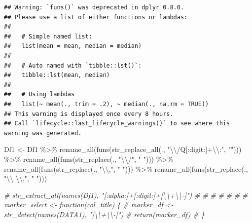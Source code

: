 \documentclass[
]{book}
\newenvironment{Shaded}{\begin{snugshade}}{\end{snugshade}}
\newcommand{\CommentTok}[1]{\textcolor[rgb]{0.56,0.35,0.01}{\textit{#1}}}
\newcommand{\FunctionTok}[1]{\textcolor[rgb]{0.00,0.00,0.00}{#1}}
\newcommand{\NormalTok}[1]{#1}
\newcommand{\OtherTok}[1]{\textcolor[rgb]{0.56,0.35,0.01}{#1}}
\newcommand{\SpecialCharTok}[1]{\textcolor[rgb]{0.00,0.00,0.00}{#1}}
\newcommand{\StringTok}[1]{\textcolor[rgb]{0.31,0.60,0.02}{#1}}
\begin{document}
\begin{verbatim}
## Warning: `funs()` was deprecated in dplyr 0.8.0.
## Please use a list of either functions or lambdas: 
## 
##   # Simple named list: 
##   list(mean = mean, median = median)
## 
##   # Auto named with `tibble::lst()`: 
##   tibble::lst(mean, median)
## 
##   # Using lambdas
##   list(~ mean(., trim = .2), ~ median(., na.rm = TRUE))
## This warning is displayed once every 8 hours.
## Call `lifecycle::last_lifecycle_warnings()` to see where this warning was generated.
\end{verbatim}

\begin{Shaded}
\begin{Highlighting}[]
\NormalTok{Df1 }\OtherTok{\textless{}{-}}\NormalTok{ Df1 }\SpecialCharTok{\%\textgreater{}\%}
  \FunctionTok{rename\_all}\NormalTok{(}\FunctionTok{funs}\NormalTok{(}\FunctionTok{str\_replace\_all}\NormalTok{(., }\StringTok{"}\SpecialCharTok{\textbackslash{}\textbackslash{}}\StringTok{/Q[:digit:]+}\SpecialCharTok{\textbackslash{}\textbackslash{}}\StringTok{:"}\NormalTok{, }\StringTok{""}\NormalTok{))) }\SpecialCharTok{\%\textgreater{}\%}
  \FunctionTok{rename\_all}\NormalTok{(}\FunctionTok{funs}\NormalTok{(}\FunctionTok{str\_replace}\NormalTok{(., }\StringTok{"}\SpecialCharTok{\textbackslash{}\textbackslash{}}\StringTok{/"}\NormalTok{, }\StringTok{" "}\NormalTok{))) }\SpecialCharTok{\%\textgreater{}\%}
  \FunctionTok{rename\_all}\NormalTok{(}\FunctionTok{funs}\NormalTok{(}\FunctionTok{str\_replace}\NormalTok{(., }\StringTok{"}\SpecialCharTok{\textbackslash{}\textbackslash{}}\StringTok{,"}\NormalTok{, }\StringTok{" "}\NormalTok{))) }\SpecialCharTok{\%\textgreater{}\%}
  \FunctionTok{rename\_all}\NormalTok{(}\FunctionTok{funs}\NormalTok{(}\FunctionTok{str\_replace}\NormalTok{(., }\StringTok{"}\SpecialCharTok{\textbackslash{}\textbackslash{}}\StringTok{ }\SpecialCharTok{\textbackslash{}\textbackslash{}}\StringTok{,"}\NormalTok{, }\StringTok{" "}\NormalTok{)))}

\CommentTok{\# str\_extract\_all(names(Df1), "[:alpha:]+[:digit:]+[\textbackslash{}\textbackslash{}+\textbackslash{}\textbackslash{}{-}]")}
\CommentTok{\# }
\CommentTok{\# }
\CommentTok{\# }
\CommentTok{\# }
\CommentTok{\# }
\CommentTok{\# }
\CommentTok{\# marker\_select \textless{}{-} function(col\_title) \{}
\CommentTok{\#   marker\_df \textless{}{-} str\_detect(names(DATA1), "[\textbackslash{}\textbackslash{}+\textbackslash{}\textbackslash{}{-}]") }
\CommentTok{\#   return(marker\_df)}
\CommentTok{\# \}}
\end{Highlighting}
\end{Shaded}
\end{document}
